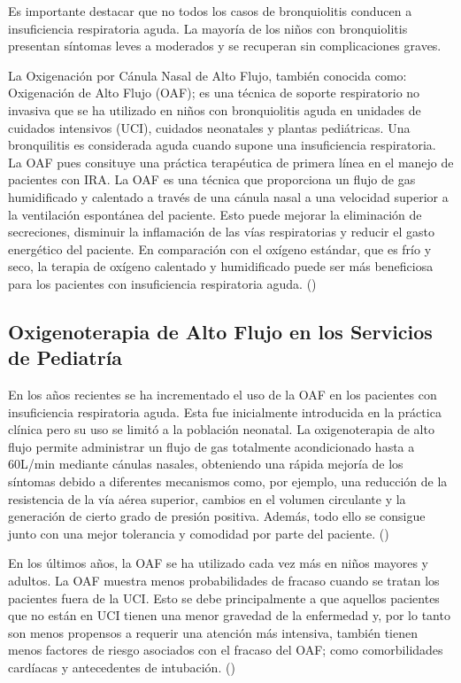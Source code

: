 Es importante destacar que no todos los casos de bronquiolitis conducen a insuficiencia respiratoria aguda. La mayoría de los niños con bronquiolitis presentan síntomas leves a moderados y se recuperan sin complicaciones graves. 

La Oxigenación por Cánula Nasal de Alto Flujo, también conocida como: Oxigenación de Alto Flujo (OAF); es una técnica de soporte respiratorio no invasiva que se ha utilizado en niños con bronquiolitis aguda en unidades de cuidados intensivos (UCI), cuidados neonatales y plantas pediátricas. Una bronquilitis es considerada aguda cuando supone una insuficiencia respiratoria. La OAF pues consituye una práctica terapéutica de primera línea en el manejo de pacientes con IRA. La OAF es una técnica que proporciona un flujo de gas humidificado y calentado a través de una cánula nasal a una velocidad superior a la ventilación espontánea del paciente. Esto puede mejorar la eliminación de secreciones, disminuir la inflamación de las vías respiratorias y reducir el gasto energético del paciente. En comparación con el oxígeno estándar, que es frío y seco, la terapia de oxígeno calentado y humidificado puede ser más beneficiosa para los pacientes con insuficiencia respiratoria aguda. (\cite{Daverio2019})


\subsection{Oxigenoterapia de Alto Flujo en los Servicios de Pediatría} 

En los años recientes se ha incrementado el uso de la OAF en los pacientes con insuficiencia respiratoria aguda. Esta fue inicialmente introducida en la práctica clínica pero su uso se limitó a la población neonatal. La oxigenoterapia de alto flujo permite administrar un flujo de gas totalmente acondicionado hasta a 60L/min mediante cánulas nasales, obteniendo una rápida mejoría de los síntomas debido a diferentes mecanismos como, por ejemplo, una reducción de la resistencia de la vía aérea superior, cambios en el volumen circulante y la generación de cierto grado de presión positiva. Además, todo ello se consigue junto con una mejor tolerancia y comodidad por parte del paciente. (\cite{Masclans2015})

En los últimos años, la OAF se ha utilizado cada vez más en niños mayores y adultos. La OAF muestra menos probabilidades de fracaso cuando se tratan los pacientes fuera de la UCI. Esto se debe principalmente a que aquellos pacientes que no están en UCI tienen una menor gravedad de la enfermedad y, por lo tanto son menos propensos a requerir una atención más intensiva, también tienen menos factores de riesgo asociados con el fracaso del OAF; como comorbilidades cardíacas y antecedentes de intubación. (\cite{Betters2017}) 

